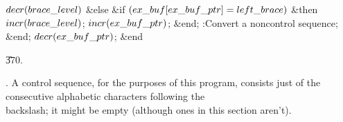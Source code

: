 $\\{decr}(\\{brace\_level})$\6
\4\&{else} \&{if} $(\\{ex\_buf}[\\{ex\_buf\_ptr}]=\\{left\_brace})$ \1\&{then}\5
$\\{incr}(\\{brace\_level})$;\2\2\6
$\\{incr}(\\{ex\_buf\_ptr})$;\6
\&{end};\2\6
:Convert a noncontrol sequence\X;\6
\&{end};\2\6
$\\{decr}(\\{ex\_buf\_ptr})$;\6
\&{end}\par
\U370.\fi

.
A control sequence, for the purposes of this program, consists just of
the consecutive alphabetic characters following the \\{backslash}; it
might be empty (although ones in this section aren't).

